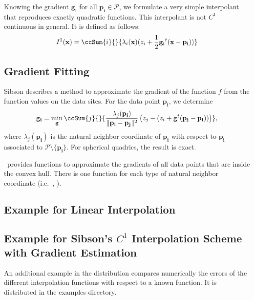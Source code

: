Knowing the gradient $\mathbf{g_i}$ for all $\mathbf{p_i} \in
\mathcal{P}$, we formulate a very simple interpolant that reproduces
exactly quadratic functions. This interpolant is not $C^1$ continuous
in general.  It is defined as follows:
\begin{displaymath}
  I^1(\mathbf{x}) = \ccSum{i}{}{ \lambda_i(\mathbf{x}) 
  (z_i + \frac{1}{2} \mathbf{g_i}^t (\mathbf{x} - \mathbf{p_i}))} 
\end{displaymath} 



\subsection{Gradient Fitting\label{s:gradient_fitting}}
Sibson describes a method to approximate the gradient of the function
$f$ from the function values on the data sites. For the data point
$\mathbf{p_i}$, we determine
$$\mathbf{g_i} 
= \min_{\mathbf{g}} 
\ccSum{j}{}{
\frac{\lambda_j(\mathbf{p_i})}{\|\mathbf{p_i} - \mathbf{p_j}\|^2}
\left( z_j - (z_i + \mathbf{g}^t (\mathbf{p_j} -\mathbf{p_i})) \right)},
$$
where $\lambda_j(\mathbf{p_i})$ is the natural neighbor coordinate
of $\mathbf{p_i}$ with respect to $\mathbf{p_i}$ associated to
$\mathcal{P} \setminus \{\mathbf{p_i}\}$. For spherical quadrics, the result is exact.

\cgal\ provides functions to approximate the gradients of all data
points that are inside the convex hull. There is one function for each
type of natural neighbor coordinate (i.e.\ , ).


\subsection{Example for Linear Interpolation\label{subsec:interpol_examples}}


\subsection{Example for Sibson's $C^1$ Interpolation Scheme with Gradient Estimation}


An additional example in the distribution compares numerically the errors of the different 
interpolation functions with respect to a known function. 
It is distributed in the examples directory.

